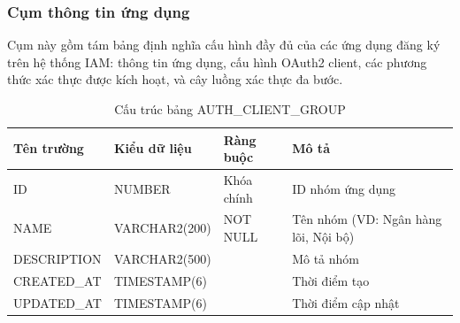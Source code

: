 \documentclass[../DoAn.tex]{subfiles}
\begin{document}
\subsubsection{Cụm thông tin ứng dụng}

Cụm này gồm tám bảng định nghĩa cấu hình đầy đủ của các ứng dụng đăng ký trên hệ thống IAM: thông tin ứng dụng, cấu hình OAuth2 client, các phương thức xác thực được kích hoạt, và cây luồng xác thực đa bước.

\begin{table}[H]
\centering
\caption{Cấu trúc bảng AUTH\_CLIENT\_GROUP}
\label{tab:auth-client-group}
\footnotesize
\begin{tabular}{|p{3.0cm}|p{2.3cm}|p{2.7cm}|p{4.5cm}|}
\hline
\textbf{Tên trường} & \textbf{Kiểu dữ liệu} & \textbf{Ràng buộc} & \textbf{Mô tả} \\ \hline
ID & NUMBER & Khóa chính & ID nhóm ứng dụng \\ \hline
NAME & VARCHAR2(200) & NOT NULL & Tên nhóm (VD: Ngân hàng lõi, Nội bộ) \\ \hline
DESCRIPTION & VARCHAR2(500) & & Mô tả nhóm \\ \hline
CREATED\_AT & TIMESTAMP(6) & & Thời điểm tạo \\ \hline
UPDATED\_AT & TIMESTAMP(6) & & Thời điểm cập nhật \\ \hline
\end{tabular}
\end{table}
\end{document}
